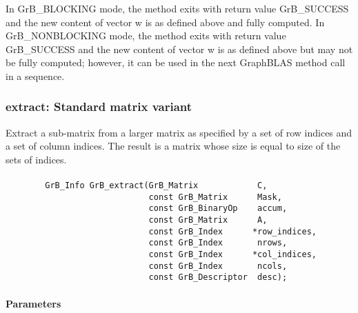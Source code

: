 In {\sf GrB\_BLOCKING} mode, the method exits with return value 
{\sf GrB\_SUCCESS} and the new content of vector {\sf w} is as defined above
and fully computed.  
In {\sf GrB\_NONBLOCKING} mode, the method exits with return value 
{\sf GrB\_SUCCESS} and the new content of vector {\sf w} is as defined above 
but may not be fully computed; however, it can be used in the next GraphBLAS 
method call in a sequence.


\subsubsection{{\sf extract}: Standard matrix variant}

Extract a sub-matrix from a larger matrix as specified by a set of row indices
and a set of column indices.  The result is a matrix whose size is equal to size of the sets of indices.

\paragraph{\syntax}

\begin{verbatim}                 
        GrB_Info GrB_extract(GrB_Matrix            C,
                             const GrB_Matrix      Mask,
                             const GrB_BinaryOp    accum,
                             const GrB_Matrix      A,
                             const GrB_Index      *row_indices,
                             const GrB_Index       nrows,
                             const GrB_Index      *col_indices,
                             const GrB_Index       ncols,
                             const GrB_Descriptor  desc);
\end{verbatim}

\paragraph{Parameters}

